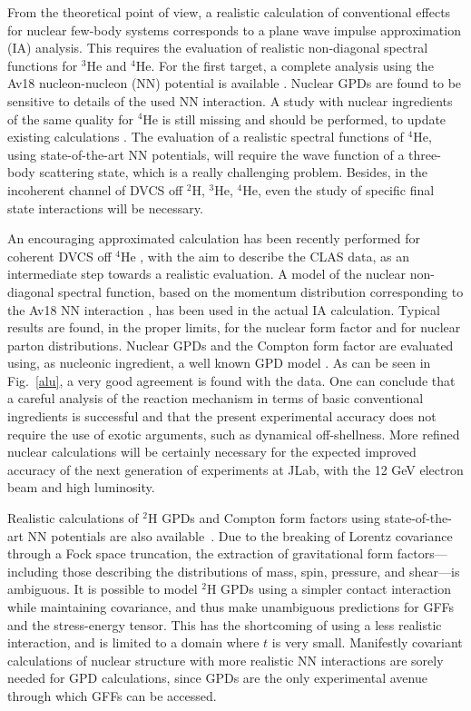 From the theoretical point of view, a realistic calculation 
of conventional effects for
nuclear few-body systems corresponds to a plane wave impulse approximation 
(IA) analysis. This requires the evaluation of realistic non-diagonal spectral
functions for $^3$He and $^4$He.
For the first target, a complete analysis using the Av18
nucleon-nucleon (NN) potential is available
\cite{Scopetta:2004kj,Scopetta:2009sn,Rinaldi:2012pj,
Rinaldi:2012ft,Rinaldi:2014bba}.
Nuclear GPDs are found to be sensitive to details of 
the used NN interaction.
A study with nuclear ingredients of the same quality
for $^4$He is still missing and should be performed, to update 
existing calculations \cite{Guzey:2003jh,Liuti:2005gi}. 
The evaluation of a realistic spectral functions of $^4$He,
using state-of-the-art NN potentials,
will require the wave function of a three-body scattering state, 
which is a really challenging problem.
Besides, in the incoherent channel of DVCS off $^2$H, $^3$He, $^4$He,
even the study of specific final state interactions will be necessary.

An encouraging approximated calculation has been recently
performed for coherent DVCS off $^4$He \cite{PhysRevC.98.015203}, with the aim to
describe the CLAS data, as an intermediate
step towards a realistic evaluation.
A model of the nuclear non-diagonal spectral function, 
based on the momentum distribution
corresponding to the Av18 NN interaction
\cite{PhysRevC.67.034003}, has been used in the 
actual IA
calculation. Typical results
are found, in the proper limits, for the nuclear form factor
and for nuclear parton distributions.
Nuclear GPDs and the
Compton form factor are evaluated using, as nucleonic ingredient,
a well known GPD model \cite{Goloskokov:2011rd}. 
As can be seen in Fig.~\ref{alu}, a very good agreement 
is found with the data.  
One can conclude that 
a careful analysis of the reaction mechanism in terms of
basic conventional ingredients is successful and that
the present experimental accuracy does not require
the use of exotic arguments, such as dynamical off-shellness.
More refined nuclear calculations will be certainly necessary for 
the expected improved accuracy of the next generation of experiments 
at JLab, with the 12 GeV electron beam and high luminosity. 

Realistic calculations of $^2$H GPDs and Compton form factors using
state-of-the-art NN potentials are also available~\cite{Cano:2003ju}.
Due to the breaking of Lorentz covariance through a Fock space truncation,
the extraction of gravitational form factors---including those describing
the distributions of mass, spin, pressure, and shear---is ambiguous.
It is possible to model $^2$H GPDs using
a simpler contact interaction while maintaining covariance, and thus
make unambiguous predictions for GFFs and the stress-energy tensor.
This has the shortcoming of using a less realistic interaction,
and is limited to a domain where $t$ is very small. Manifestly covariant
calculations of nuclear structure with more realistic NN interactions
are sorely needed for GPD calculations, since GPDs are the only experimental
avenue through which GFFs can be accessed.
  
